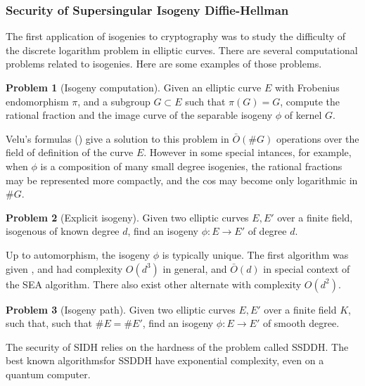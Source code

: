 \documentclass{article}
\theoremstyle{theorem}
\theoremstyle{definition}
\newtheorem{problem}{Problem}
\begin{document}
\subsubsection{Security of Supersingular Isogeny Diffie-Hellman}

The first application of isogenies to cryptography was to study  the difficulty of the discrete logarithm problem in elliptic curves. There are several computational problems related to isogenies. Here are some examples of those problems.

\begin{problem}[Isogeny computation]
	Given an elliptic curve $E$ with Frobenius endomorphism  $\pi$, and a subgroup $G \subset E$ such that $\pi(G) = G$, compute the rational fraction and the image curve of the separable isogeny $\phi$ of kernel $G$.
\end{problem}

Velu's formulas (\cite[Proposition 38]{IsogenyCryptoDeFeo}) give a solution to this problem in $\bar{O}(\#G)$ operations over the field of definition of the curve $E$. However in some special intances, for example, when $\phi$ is a composition of many small degree isogenies, the rational fractions may be represented more compactly, and the cos may become only logarithmic in $\#G$.

\begin{problem}[Explicit isogeny]
	Given two elliptic curves $E, E'$ over a finite field, isogenous of known degree $d$, find an isogeny $\phi: E \to E'$ of degree $d$.
\end{problem}

Up to automorphism, the isogeny $\phi$ is typically unique. The first algorithm was given \cite{Elkies92}, \cite{Elkies98} and had complexity $O(d^3)$ in general, and $\bar{O}(d)$ in special context  of the SEA algorithm. There also exist other alternate with complexity $O(d^2)$.

\begin{problem}[Isogeny path]
	Given two elliptic curves $E, E'$ over a finite field $K$, such that, such that $\#E = \#E'$, find an isogeny $\phi: E \to E'$ of smooth degree.
\end{problem}

The security of SIDH relies on the hardness of the problem called SSDDH. The best known algorithmsfor SSDDH have exponential complexity, even on a quantum computer.
\end{document}
